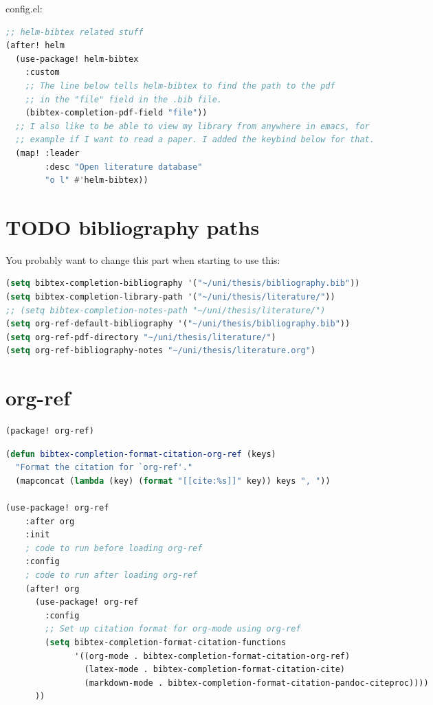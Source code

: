 \documentclass[a4paper,oneside,toc=bibliography,toc=listof]{scrbook}
\newenvironment{widemargin}{
\begin{center}
\begin{adjustwidth}{-1.5cm}{-1.5cm}
}{
\end{adjustwidth}
\end{center}
}
\begin{document}
config.el:  
\begin{lstlisting}[language=Lisp,numbers=none]
;; helm-bibtex related stuff
(after! helm
  (use-package! helm-bibtex
    :custom
    ;; The line below tells helm-bibtex to find the path to the pdf
    ;; in the "file" field in the .bib file.
    (bibtex-completion-pdf-field "file"))
  ;; I also like to be able to view my library from anywhere in emacs, for
  ;; example if I want to read a paper. I added the keybind below for that.
  (map! :leader
        :desc "Open literature database"
        "o l" #'helm-bibtex))
\end{lstlisting}
\section{{\bfseries\sffamily TODO} bibliography paths}
\label{sec:org4410698}
You probably want to change this part when starting to use this:

\begin{lstlisting}[language=Lisp,numbers=none]
(setq bibtex-completion-bibliography '("~/uni/thesis/bibliography.bib"))
(setq bibtex-completion-library-path '("~/uni/thesis/literature/"))
;; (setq bibtex-completion-notes-path "~/uni/thesis/literature/")
(setq org-ref-default-bibliography '("~/uni/thesis/bibliography.bib"))
(setq org-ref-pdf-directory "~/uni/thesis/literature/")
(setq org-ref-bibliography-notes "~/uni/thesis/literature.org")
\end{lstlisting}
\section{org-ref}
\label{sec:orgac0e126}

\begin{lstlisting}[language=Lisp,numbers=none]
(package! org-ref)
\end{lstlisting}
\begin{widemargin}
\begin{lstlisting}[language=Lisp,numbers=none]
(defun bibtex-completion-format-citation-org-ref (keys)
  "Format the citation for `org-ref'."
  (mapconcat (lambda (key) (format "[[cite:%s]]" key)) keys ", "))

(use-package! org-ref
    :after org
    :init
    ; code to run before loading org-ref
    :config
    ; code to run after loading org-ref
    (after! org
      (use-package! org-ref
        :config
        ;; Set up citation format for org-mode using org-ref
        (setq bibtex-completion-format-citation-functions
              '((org-mode . bibtex-completion-format-citation-org-ref)
                (latex-mode . bibtex-completion-format-citation-cite)
                (markdown-mode . bibtex-completion-format-citation-pandoc-citeproc))))
      ))
\end{lstlisting}
\end{widemargin}
\end{document}
